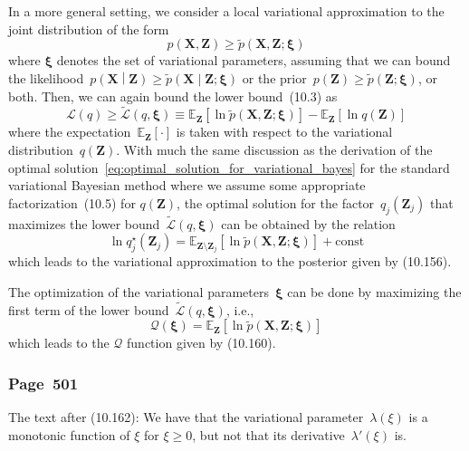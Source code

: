 \documentclass[12pt,a4paper]{article}
\newcommand{\erratum}[1]{%
\subsubsection*{#1}
\addcontentsline{toc}{subsection}{#1}}
\begin{document}
In a more general setting, we consider a local variational approximation to
the joint distribution of the form
\begin{equation}
p\left(\mathbf{X}, \mathbf{Z}\right) \geqslant
\widetilde{p}\left(\mathbf{X}, \mathbf{Z}; \bm{\xi} \right)
\end{equation}
where $\bm{\xi}$ denotes the set of variational parameters,
assuming that we can bound the likelihood~$p\left(\mathbf{X} \middle| \mathbf{Z}\right) \geqslant
\widetilde{p}\left(\mathbf{X} \middle| \mathbf{Z}; \bm{\xi} \right)$
or the prior~$p\left(\mathbf{Z}\right) \geqslant
\widetilde{p}\left(\mathbf{Z}; \bm{\xi} \right)$, or both.
Then, we can again bound the lower bound~(10.3) as
\begin{equation}
\mathcal{L}(q) \geqslant 
\widetilde{\mathcal{L}}(q, \bm{\xi}) \equiv
\mathbb{E}_{\mathbf{Z}}\left[\ln \widetilde{p}\left(\mathbf{X}, \mathbf{Z}; \bm{\xi}\right)\right]
- \mathbb{E}_{\mathbf{Z}}\left[\ln q\left(\mathbf{Z}\right)\right]
\label{eq:bound_of_lower_bound}
\end{equation}
where the expectation~$\mathbb{E}_{\mathbf{Z}}[\cdot]$ is taken with respect to
the variational distribution~$q(\mathbf{Z})$.
With much the same discussion as the derivation of
the optimal solution~\eqref{eq:optimal_solution_for_variational_bayes}
for the standard variational Bayesian method
where we assume some appropriate factorization~(10.5) for $q(\mathbf{Z})$,
the optimal solution for the factor~$q_j(\mathbf{Z}_j)$ that maximizes
the lower bound~$\widetilde{\mathcal{L}}(q, \bm{\xi})$ can be obtained by the relation
\begin{equation}
\ln q_j^{\star}\left(\mathbf{Z}_j\right) =
\mathbb{E}_{\mathbf{Z}\setminus\mathbf{Z}_j}
\left[ \ln \widetilde{p}\left(\mathbf{X}, \mathbf{Z}; \bm{\xi}\right) \right] +
\text{const}
\label{eq:optimal_solution_for_local_variational_bayes}
\end{equation}
which leads to the variational approximation to the posterior given by (10.156).

The optimization of the variational parameters~$\bm{\xi}$ can be done by maximizing
the first term of the lower bound~$\widetilde{\mathcal{L}}(q, \bm{\xi})$, i.e.,
\begin{equation}
\mathcal{Q}(\bm{\xi}) =
\mathbb{E}_{\mathbf{Z}}\left[\ln \widetilde{p}\left(\mathbf{X}, \mathbf{Z}; \bm{\xi}\right)\right]
\end{equation}
which leads to the $\mathcal{Q}$ function given by (10.160).

\erratum{Page~501}
The text after (10.162):
We have that
the variational parameter~$\lambda(\xi)$ is a monotonic function of $\xi$ for $\xi \geqslant 0$,
but not that its derivative~$\lambda'(\xi)$ is.
\end{document}
